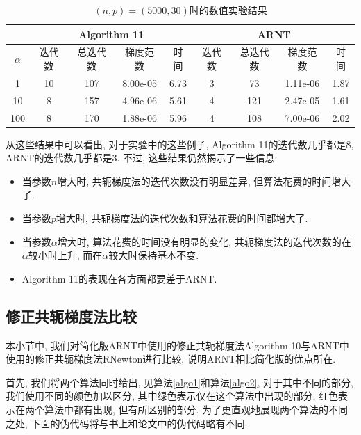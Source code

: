 \documentclass[UTF8]{ctexart}
\begin{document}
\begin{table}[htb]
    \centering
    \begin{tabular}{|c|cccc|cccc|}
        \hline
         & \multicolumn{4}{|c|}{Algorithm 11} & \multicolumn{4}{|c|}{ARNT}\\
        \hline
        $\alpha$ & 迭代数 & 总迭代数 & 梯度范数 & 时间 & 迭代数 & 总迭代数 & 梯度范数 & 时间\\
        \hline
        1 & 10 & 107 & 8.00e-05 & 6.73 & 3 & 73 & 1.11e-06 & 1.87 \\
        \hline
        10 & 8 & 157 & 4.96e-06 & 5.61 & 4 & 121 & 2.47e-05 & 1.61 \\
        \hline 
        100 & 8 & 170 & 1.88e-06 & 5.96 & 4 & 108 & 7.00e-06 & 2.02 \\
        \hline
    \end{tabular}
    \caption{$(n,p)=(5000,30)$时的数值实验结果}\label{tab5}
\end{table}

从这些结果中可以看出, 对于实验中的这些例子, Algorithm 11的迭代数几乎都是$8$, ARNT的迭代数几乎都是$3$. 不过, 这些结果仍然揭示了一些信息: 
\begin{itemize}
    \item 当参数$n$增大时, 共轭梯度法的迭代次数没有明显差异, 但算法花费的时间增大了. 
    \item 当参数$p$增大时, 共轭梯度法的迭代次数和算法花费的时间都增大了. 
    \item 当参数$\alpha$增大时, 算法花费的时间没有明显的变化, 共轭梯度法的迭代次数的在$\alpha$较小时上升, 而在$\alpha$较大时保持基本不变. 
    \item Algorithm 11的表现在各方面都要差于ARNT. 
\end{itemize}

\subsection{修正共轭梯度法比较}

本小节中, 我们对简化版ARNT中使用的修正共轭梯度法Algorithm 10与ARNT中使用的修正共轭梯度法RNewton进行比较, 说明ARNT相比简化版的优点所在. 

首先, 我们将两个算法同时给出, 见算法\ref{algo1}和算法\ref{algo2}, 对于其中不同的部分, 我们使用不同的颜色加以区分, 其中绿色表示仅在这个算法中出现的部分, 红色表示在两个算法中都有出现, 但有所区别的部分. 为了更直观地展现两个算法的不同之处, 下面的伪代码将与书上和论文中的伪代码略有不同. 
\end{document}
